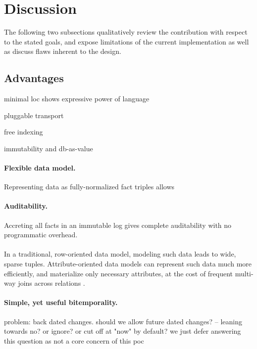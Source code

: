 \cleardoublepage
\section{Discussion}\label{sec:discussion}

The following two subsections qualitatively review the contribution with respect to the stated goals, and expose limitations of the current implementation as well as discuss flaws inherent to the design.

\subsection{Advantages}

minimal loc shows expressive power of language

pluggable transport

free indexing

immutability and db-as-value

\paragraph{Flexible data model.} Representing data as fully-normalized fact triples allows

\paragraph{Auditability.} Accreting all facts in an immutable log gives complete auditability with no programmatic overhead.



\paragraph{}
In a traditional, row-oriented data model, modeling such data leads to wide, sparse tuples. Attribute-oriented data models can represent such data much more efficiently, and materialize only necessary attributes, at the cost of frequent multi-way joins across relations \cite{gobel2019optimising}.


\paragraph{Simple, yet useful bitemporality.}
problem: back dated changes. should we allow future dated changes? -- leaning towards no? or ignore? or cut off at "now" by default? we just defer answering this question as not a core concern of this poc

